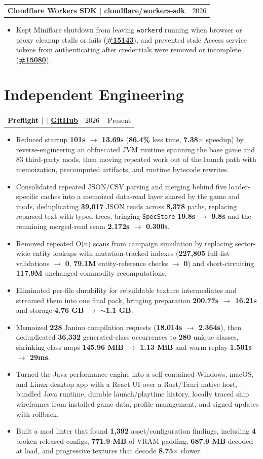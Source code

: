 \documentclass[letterpaper,11pt]{article}
\makeatletter
\newcommand{\resumeHeadingSimple}[2]{%
  \begin{tabularx}{\textwidth}{@{}Xr@{}}
    \textbf{#1} & #2
  \end{tabularx}\vspace{-1pt}
}
\newcommand{\resumeItemListStart}{\begin{itemize}[leftmargin=0.23in,itemsep=0.4pt,parsep=0pt,topsep=0.5pt]}
\newcommand{\resumeItem}[1]{\item\fontsize{9.9pt}{11.1pt}\selectfont #1}
\newcommand{\resumeItemListEnd}{\end{itemize}\vspace{-1.25pt}}
\makeatother
\begin{document}
\resumeHeadingSimple
  {Cloudflare Workers SDK $|$ \href{https://redirect.github.com/cloudflare/workers-sdk}{cloudflare/workers-sdk}}
  {2026}
\resumeItemListStart
  \resumeItem{Kept Miniflare shutdown from leaving \texttt{workerd} running when browser or proxy cleanup stalls or fails (\href{https://redirect.github.com/cloudflare/workers-sdk/pull/15143}{\textbf{\#15143}}), and prevented stale Access service tokens from authenticating after credentials were removed or incomplete (\href{https://redirect.github.com/cloudflare/workers-sdk/pull/15080}{\textbf{\#15080}}).}
\resumeItemListEnd

\section{Independent Engineering}

\resumeHeadingSimple
  {Preflight $|$ \normalfont{Cross-platform performance launcher \& mod analysis toolkit} $|$ \href{https://github.com/teamleaderleo/preflight}{GitHub}}
  {2026 -- Present}
\resumeItemListStart
  \resumeItem{Reduced startup \textbf{101s $\rightarrow$ 13.69s} (\textbf{86.4\%} less time, \textbf{7.38$\times$} speedup) by reverse-engineering an obfuscated JVM runtime spanning the base game and 83 third-party mods, then moving repeated work out of the launch path with memoization, precomputed artifacts, and runtime bytecode rewrites.}
  \resumeItem{Consolidated repeated JSON/CSV parsing and merging behind five loader-specific caches into a memoized data-read layer shared by the game and mods, deduplicating \textbf{39,017} JSON reads across \textbf{8,378} paths, replacing reparsed text with typed trees, bringing \texttt{SpecStore} \textbf{19.8s $\rightarrow$ 9.8s} and the remaining merged-read seam \textbf{2.172s $\rightarrow$ 0.300s}.}
  \resumeItem{Removed repeated O(n) scans from campaign simulation by replacing sector-wide entity lookups with mutation-tracked indexes (\textbf{227,805} full-list validations $\rightarrow$ \textbf{0}, \textbf{79.1M} entity-reference checks $\rightarrow$ \textbf{0}) and short-circuiting \textbf{117.9M} unchanged commodity recomputations.}
  \resumeItem{Eliminated per-file durability for rebuildable texture intermediates and streamed them into one final pack, bringing preparation \textbf{200.77s $\rightarrow$ 16.21s} and storage \textbf{4.76 GB $\rightarrow$ $\sim$1.1 GB}.}
  \resumeItem{Memoized \textbf{228} Janino compilation requests (\textbf{18.014s $\rightarrow$ 2.364s}), then deduplicated \textbf{36,332} generated-class occurrences to \textbf{280} unique classes, shrinking class maps \textbf{145.96 MiB $\rightarrow$ 1.13 MiB} and warm replay \textbf{1.501s $\rightarrow$ 29ms}.}
  \resumeItem{Turned the Java performance engine into a self-contained Windows, macOS, and Linux desktop app with a React UI over a Rust/Tauri native host, bundled Java runtime, durable launch/playtime history, locally traced ship wireframes from installed game data, profile management, and signed updates with rollback.}
  \resumeItem{Built a mod linter that found \textbf{1,392} asset/configuration findings, including \textbf{4} broken released configs, \textbf{771.9 MB} of VRAM padding, \textbf{687.9 MB} decoded at load, and progressive textures that decode \textbf{8.75$\times$} slower.}
\resumeItemListEnd
\end{document}
